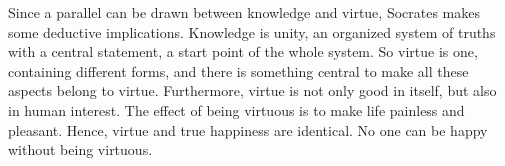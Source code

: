 \documentclass[11pt]{article}
\begin{document}
\newline

Since a parallel can be drawn between knowledge and virtue, Socrates makes some deductive implications. 
Knowledge is unity, an organized system of truths with a central statement, a start point of the whole system. 
So virtue is one, containing different forms, and there is something central to make all these aspects belong to virtue. 
Furthermore, virtue is not only good in itself, but also in human interest. 
The effect of being virtuous is to make life painless and pleasant. 
Hence, virtue and true happiness are identical. 
No one can be happy without being virtuous.
  
\end{document}

